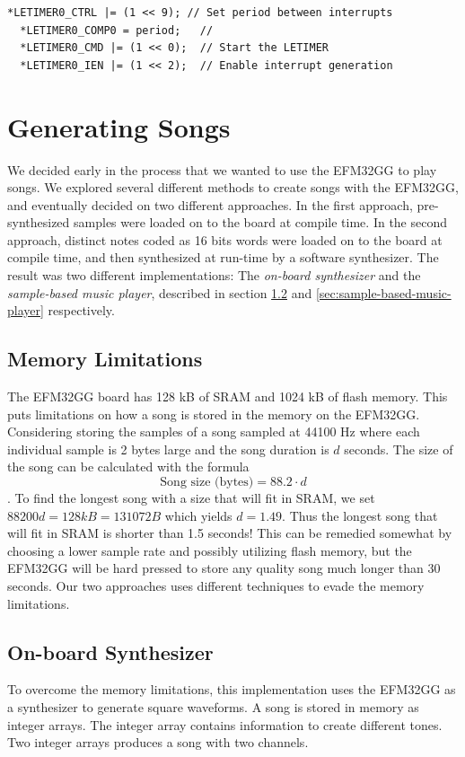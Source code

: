 \noindent\begin{minipage}[c]{\textwidth}
  \begin{lstlisting}[caption=Setting up LETIMER to generate periodic interrupts,label={lst:letimer-setup}]
  *LETIMER0_CTRL |= (1 << 9); // Set period between interrupts
  *LETIMER0_COMP0 = period;   // 
  *LETIMER0_CMD |= (1 << 0);  // Start the LETIMER
  *LETIMER0_IEN |= (1 << 2);  // Enable interrupt generation
  \end{lstlisting}
\end{minipage}


\section{Generating Songs}
We decided early in the process that we wanted to use the EFM32GG to play songs. We explored several different methods to create songs with the EFM32GG, and eventually decided on two different approaches. In the first approach, pre-synthesized samples were loaded on to the board at compile time. In the second approach, distinct notes coded as 16 bits words were loaded on to the board at compile time, and then synthesized at run-time by a software synthesizer. The result was two different implementations: The \emph{on-board synthesizer} and the \emph{sample-based music player}, described in section \ref{sec:onboard-synthesizer} and \ref{sec:sample-based-music-player} respectively.

\subsection{Memory Limitations}
The EFM32GG board has 128 kB of SRAM and 1024 kB of flash memory. This puts limitations on how a song is stored in the memory on the EFM32GG. Considering storing the samples of a song sampled at 44100 Hz where each individual sample is 2 bytes large and the song duration is $d$ seconds. The size of the song can be calculated with the formula
$$\text{Song size (bytes)} = 88.2 \cdot d$$.
To find the longest song with a size that will fit in SRAM, we set $88200d = 128 kB = 131072 B$ which yields $d = 1.49$. Thus the longest song that will fit in SRAM is shorter than 1.5 seconds! This can be remedied somewhat by choosing a lower sample rate and possibly utilizing flash memory, but the EFM32GG will be hard pressed to store any quality song much longer than 30 seconds. Our two approaches uses different techniques to evade the memory limitations.

\subsection{On-board Synthesizer}\label{sec:onboard-synthesizer}
To overcome the memory limitations, this implementation uses the EFM32GG as a synthesizer to generate square waveforms. A song is stored in memory as integer arrays. The integer array contains information to create different tones. Two integer arrays produces a song with two channels.

